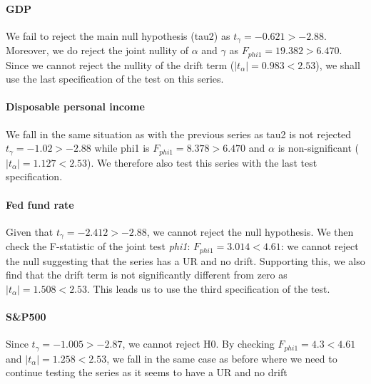 \documentclass[hidelinks,12pts]{article}
\DeclareMathOperator{\1}{\mathbbm{1}}
\begin{document}
\paragraph{GDP}
We fail to reject the main null hypothesis (tau2) as $t_\gamma = -0.621 > -2.88$.
Moreover, we do reject the joint nullity of $\alpha$ and $\gamma$ as $F_{phi1} = 19.382 > 6.470$. 
Since we cannot reject the nullity of the drift term ($|t_\alpha| = 0.983< 2.53$), we shall use the last specification of the test on this series. 


\paragraph{Disposable personal income}
We fall in the same situation as with the previous series as tau2 is not rejected $t_\gamma = -1.02 > -2.88$ while phi1 is $F_{phi1} = 8.378 > 6.470$ and $\alpha$ is non-significant ($|t_\alpha| = 1.127< 2.53$). 
We therefore also test this series with the last test specification.


\paragraph{Fed fund rate}
Given that $t_\gamma = -2.412 >-2.88$, we cannot reject the null hypothesis. 
We then check the F-statistic of the joint test \emph{phi1}: $F_{phi1} = 3.014 < 4.61$: we cannot reject the null suggesting that the series has a UR and no drift.
Supporting this, we also find that the drift term is not significantly different from zero as $|t_\alpha| = 1.508 < 2.53$.
This leads us to use the third specification of the test.


\paragraph{S\&P500}
Since $t_\gamma = -1.005> -2.87$, we cannot reject H0.
By checking $F_{phi1} = 4.3 <4.61$ and $|t_\alpha| = 1.258 <2.53$, we fall in the same case as before where we need to continue testing the series as it seems to have a UR and no drift

\end{document}
